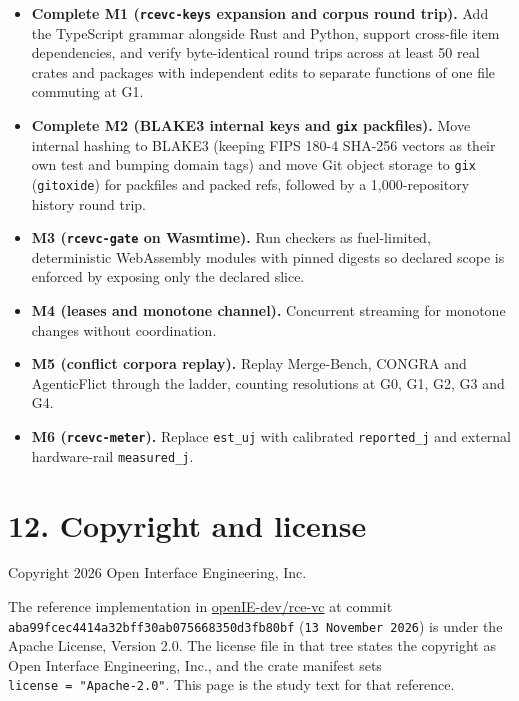 \documentclass[10pt,letterpaper]{article}
\providecommand{\tightlist}{\setlength{\itemsep}{1pt}\setlength{\parskip}{0pt}}
\begin{document}
\begin{itemize}
\tightlist
\item
  \textbf{Complete M1 (\texttt{rcevc-keys} expansion and corpus round
  trip).} Add the TypeScript grammar alongside Rust and Python, support
  cross-file item dependencies, and verify byte-identical round trips
  across at least 50 real crates and packages with independent edits to
  separate functions of one file commuting at G1.
\item
  \textbf{Complete M2 (BLAKE3 internal keys and \texttt{gix}
  packfiles).} Move internal hashing to BLAKE3 (keeping FIPS 180-4
  SHA-256 vectors as their own test and bumping domain tags) and move
  Git object storage to \texttt{gix} (\texttt{gitoxide}) for packfiles
  and packed refs, followed by a 1,000-repository history round trip.
\item
  \textbf{M3 (\texttt{rcevc-gate} on Wasmtime).} Run checkers as
  fuel-limited, deterministic WebAssembly modules with pinned digests so
  declared scope is enforced by exposing only the declared slice.
\item
  \textbf{M4 (leases and monotone channel).} Concurrent streaming for
  monotone changes without coordination.
\item
  \textbf{M5 (conflict corpora replay).} Replay Merge-Bench, CONGRA and
  AgenticFlict through the ladder, counting resolutions at G0, G1, G2,
  G3 and G4.
\item
  \textbf{M6 (\texttt{rcevc-meter}).} Replace \texttt{est\_uj} with
  calibrated \texttt{reported\_j} and external hardware-rail
  \texttt{measured\_j}.
\end{itemize}

\section{12. Copyright and license}\label{copyright-and-license}

Copyright 2026 Open Interface Engineering, Inc.

The reference implementation in
\href{https://github.com/openIE-dev/rce-vc}{openIE-dev/rce-vc} at commit
\texttt{aba99fcec441\allowbreak{}4a32bff30ab0\allowbreak{}75668350d3fb80bf}
(\texttt{13\ November\ 2026}) is under the Apache License, Version 2.0.
The license file in that tree states the copyright as Open Interface
Engineering, Inc., and the crate manifest sets
\texttt{license\ =\ "Apache-\allowbreak{}2.\allowbreak{}0"}. This page is the study text for that
reference.
\end{document}
